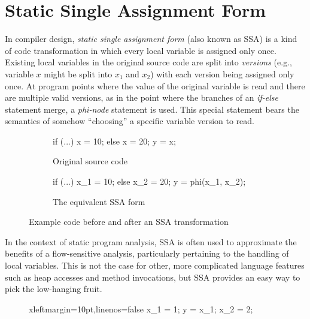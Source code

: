 \section{Static Single Assignment Form}
\label{sec:intro:ssa}

In compiler design, \emph{static single assignment form} (also known as SSA) is a kind of code transformation in which every local variable is assigned only once. Existing local variables in the original source code are split into \emph{versions} (e.g., variable $x$ might be split into $x_1$ and $x_2$) with each version being assigned only once. At program points where the value of the original variable is read and there are multiple valid versions, as in the point where the branches of an \emph{if-else} statement merge, a \emph{phi-node} statement is used. This special statement bears the semantics of somehow ``choosing'' a specific variable version to read.

\begin{figure}[h]
\begin{subfigure}{.45\textwidth}
\begin{javacode}
if (...) x = 10;
else x = 20;
y = x;
\end{javacode}
\caption{Original source code}
\end{subfigure}%
\hfill
\begin{subfigure}{.45\textwidth}
\begin{javacode}
if (...) x_1 = 10;
else x_2 = 20;
y = phi(x_1, x_2);
\end{javacode}
\caption{The equivalent SSA form}
\end{subfigure}
\caption{Example code before and after an SSA transformation}
\end{figure}

In the context of static program analysis, SSA is often used to approximate the benefits of a flow-sensitive analysis, particularly pertaining to the handling of local variables. This is not the case for other, more complicated language features such as heap accesses and method invocations, but SSA provides an easy way to pick the low-hanging fruit.

\setlength\intextsep{15pt}
\begin{figure}
\centering
\begin{javacode*}{xleftmargin=10pt,linenos=false}
x_1 = 1;
y = x_1;
x_2 = 2;
\end{javacode*}
\end{figure}

